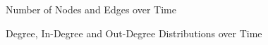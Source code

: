 \documentclass[10pt]{article}
\begin{document}
\begin{multicols}{2}
\begin{figure}
\caption{Number of Nodes and Edges over Time \label{fig:growth}}
\end{figure}

\begin{figure}
\caption{Degree, In-Degree and Out-Degree Distributions over Time \label{fig:degree}}
\end{figure}


\end{multicols}
\end{document}
